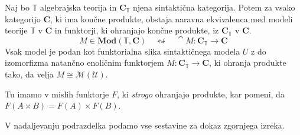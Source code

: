 \documentclass[../kategoricna_logika.tex]{subfiles}
\begin{document}
\begin{izrek}\label{sec:modeli-kot-funtorji}
Naj bo $\mathbb{T}$ algebrajska teorija in $\mathbf{C}_{\mathbb{T}}$ njena
sintaktična kategorija. Potem za vsako kategorijo $\mathbf{C}$, ki ima končne
produkte, obstaja naravna ekvivalenca med modeli teorije $\mathbb{T}$ v
$\mathbf{C}$ in funktorji, ki ohranjajo končne produkte, iz
$\mathbf{C}_{\mathbb{T}}$ v $\mathbf{C}$.
$$M \in \mathbf{Mod}(\mathbb{T}, \mathbf{C})\quad \leftrightsquigarrow \quad \cat{M} : \mathbf{C}_\mathbb{T} \to \mathbf{C}$$
Vsak model je podan kot funktorialna slika sintaktičnega modela
$U$ z do izomorfizma natančno enoličnim funktorjem
$M : \mathbf{C}_{\mathbb{T}} \to \mathbf{C}$, ki ohranja produkte tako, da velja
$M \cong \mathcal{M}(\mathcal{U})$.
\end{izrek}
\begin{opomba}
  Tu imamo v mislih funktorje $F$, ki \emph{strogo} ohranjajo produkte, kar pomeni,
  da $F(A \times B) = F(A) \times F(B)$.
\end{opomba}
V nadaljevanju podrazdelka podamo vse sestavine za dokaz zgornjega izreka.
\end{document}
